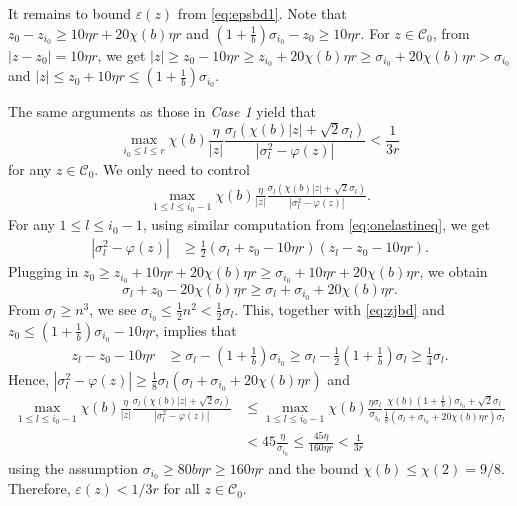 \documentclass[reqno]{amsart}
\newcommand{\eps}{\varepsilon}
\theoremstyle{plain}
\theoremstyle{definition}
\begin{document}
It remains to bound $\eps(z)$ from \eqref{eq:epsbd1}. Note that $z_0 - z_{i_0} \ge 10 \eta r + 20\chi(b) \eta r$ and $(1+\frac{1}{b})\sigma_{i_0} - z_0 \ge 10 \eta r$.  For $z\in \mathcal C_0$, from $|z-z_0| = 10 \eta r$, we get $|z| \ge z_0 - 10 \eta r \ge z_{i_0} + 20\chi(b) \eta r \ge \sigma_{i_0} + 20\chi(b) \eta r> \sigma_{i_0}$ and $|z| \le z_0 + 10 \eta r\le (1+\frac{1}{b})\sigma_{i_0}.$

The same arguments as those in \emph{Case 1} yield that 
$$\max_{i_0\le l \le r}  \chi(b)\frac{\eta}{|z|}\frac{\sigma_l (\chi(b) |z|+\sqrt{2}\sigma_l)}{|\sigma_l^2 - \varphi(z)|} < \frac{1}{3r}$$ for any $z\in \mathcal C_0$. 
We only need to control
\begin{align*}
\max_{1\le l \le i_0-1}  \chi(b)\frac{\eta}{|z|}\frac{\sigma_l (\chi(b) |z|+\sqrt{2}\sigma_l)}{|\sigma_l^2 - \varphi(z)|}.
\end{align*}
For any $1\le l \le i_0-1$,  using similar computation from \eqref{eq:onelastineq}, we get
\begin{align*}
|\sigma_l^2 - \varphi(z)| &\ge \frac{1}{2}(\sigma_l + z_0 -10\eta r)(z_l-z_0 -10\eta r).
\end{align*}
Plugging in $z_0 \ge z_{i_0} + 10 \eta r + 20\chi(b) \eta r\ge \sigma_{i_0}+10 \eta r + 20\chi(b) \eta r$, we obtain $$\sigma_l + z_0 -20\chi(b)\eta r \ge \sigma_l + \sigma_{i_0} +20\chi(b)\eta r.$$ From $\sigma_l  \geq n^3$, we see $\sigma_{i_0}\leq \frac{1}{2}n^2 < \frac{1}{2}\sigma_l$. This, together with \eqref{eq:zjbd} and $z_0\le (1+\frac{1}{b}) \sigma_{i_0} - 10\eta r$, implies that 
\begin{align*}
z_l-z_0 -10\eta r &\ge \sigma_l -(1+\frac{1}{b}) \sigma_{i_0} \ge \sigma_l - \frac{1}{2}(1+\frac{1}{b}) \sigma_l \ge \frac{1}{4}\sigma_l.
\end{align*}
Hence, $|\sigma_l^2 - \varphi(z)| \ge \frac{1}{8} \sigma_l (\sigma_l + \sigma_{i_0} +20\chi(b)\eta r)$ and 
\begin{align*}
\max_{1\le l \le i_0-1}  \chi(b)\frac{\eta}{|z|}\frac{\sigma_l (\chi(b) |z|+\sqrt{2}\sigma_l)}{|\sigma_l^2 - \varphi(z)|}&\le \max_{1\le l \le i_0-1}  \chi(b)\frac{\eta \sigma_l}{\sigma_{i_0}}\frac{\chi(b) (1+\frac{1}{b}) \sigma_{i_0} +\sqrt{2}\sigma_l}{\frac{1}{8}(\sigma_l + \sigma_{i_0} +20\chi(b)\eta r) \sigma_l }\\
&< 45 \frac{\eta}{\sigma_{i_0}} \le  \frac{45\eta}{160\eta r}< \frac{1}{3r}
\end{align*}using the assumption $\sigma_{i_0}\ge 80b \eta r\ge 160 \eta r$ and the bound $\chi(b)\le \chi(2)=9/8$.
Therefore, $\eps(z) < {1}/{3r}$ for all $z\in \mathcal C_0.$ 
\end{document}
